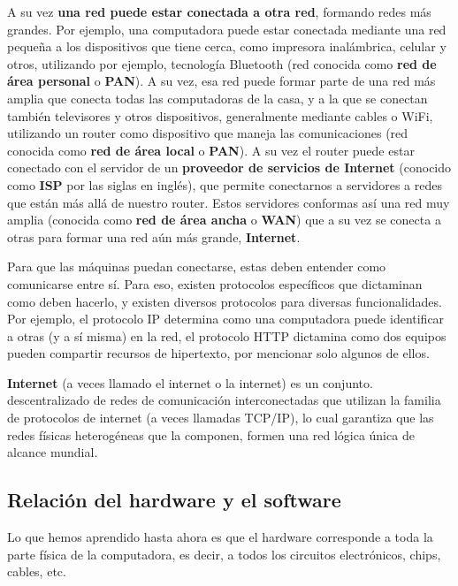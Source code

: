 A su vez \textbf{una red puede estar conectada a otra red}, formando redes más
grandes. Por ejemplo, una computadora puede estar conectada mediante una red
pequeña a los dispositivos que tiene cerca, como impresora inalámbrica, celular
y otros, utilizando por ejemplo, tecnología Bluetooth (red conocida como
\textbf{red de área personal} o \textbf{PAN}). A su vez, esa red puede
formar parte de una red más amplia que conecta todas las computadoras de la
casa, y a la que se conectan también televisores y otros dispositivos,
generalmente mediante cables o WiFi, utilizando un router como dispositivo que
maneja las comunicaciones (red conocida como \textbf{red de área local} o
\textbf{PAN}). A su vez el router puede estar conectado con el servidor de un
\textbf{proveedor de servicios de Internet} (conocido como \textbf{ISP} por
las siglas en inglés), que permite conectarnos a servidores a redes que están
más allá de nuestro router. Estos servidores conformas así una red muy amplia
(conocida como \textbf{red de área ancha} o \textbf{WAN}) que a su vez se
conecta a otras para formar una red aún más grande, \textbf{Internet}.

Para que las máquinas puedan conectarse, estas deben entender como comunicarse
entre sí. Para eso, existen protocolos específicos que dictaminan como deben
hacerlo, y existen diversos protocolos para diversas funcionalidades. Por ejemplo,
el protocolo IP determina como una computadora puede identificar a otras (y a sí
misma) en la red, el protocolo HTTP dictamina como dos equipos pueden compartir
recursos de hipertexto, por mencionar solo algunos de ellos.

\begin{definition}
    \textbf{Internet} (a veces llamado el internet o la internet) es un conjunto.
    descentralizado de redes de comunicación interconectadas que utilizan la
    familia de protocolos de internet (a veces llamadas TCP/IP), lo cual garantiza
    que las redes físicas heterogéneas que la componen, formen una red lógica
    única de alcance mundial.\autocite[vid. p. 256]{downing_2009}
\end{definition}

\subsection{Relación del hardware y el software}

Lo que hemos aprendido hasta ahora es que el hardware corresponde a toda la
parte física de la computadora, es decir, a todos los circuitos electrónicos,
chips, cables, etc.

